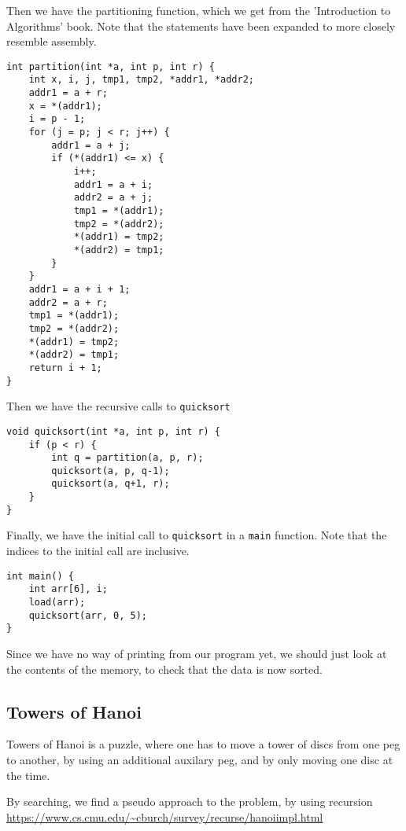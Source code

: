 \documentclass{beamer}
\begin{document}
\begin{frame}
    Then we have the partitioning function, which we get from the 'Introduction
    to Algorithms' book. Note that the statements have been expanded to more
    closely resemble assembly.
\end{frame}
\begin{frame}[fragile]
\begin{lstlisting}
int partition(int *a, int p, int r) {
    int x, i, j, tmp1, tmp2, *addr1, *addr2;
    addr1 = a + r;
    x = *(addr1);
    i = p - 1;
    for (j = p; j < r; j++) {
        addr1 = a + j;
        if (*(addr1) <= x) {
            i++;
            addr1 = a + i;
            addr2 = a + j;
            tmp1 = *(addr1);
            tmp2 = *(addr2);
            *(addr1) = tmp2;
            *(addr2) = tmp1;
        }
    }
    addr1 = a + i + 1;
    addr2 = a + r;
    tmp1 = *(addr1);
    tmp2 = *(addr2);
    *(addr1) = tmp2;
    *(addr2) = tmp1;
    return i + 1;
}
\end{lstlisting}
\end{frame}
\begin{frame}[fragile]
    Then we have the recursive calls to \texttt{quicksort}
\begin{lstlisting}
void quicksort(int *a, int p, int r) {
    if (p < r) {
        int q = partition(a, p, r);
        quicksort(a, p, q-1);
        quicksort(a, q+1, r);
    }
}
\end{lstlisting}
\end{frame}
\begin{frame}[fragile]
    Finally, we have the initial call to \texttt{quicksort} in a \texttt{main}
    function. Note that the indices to the initial call are inclusive.
\begin{lstlisting}
int main() {
    int arr[6], i;
    load(arr);
    quicksort(arr, 0, 5);
}
\end{lstlisting}
\end{frame}
\begin{frame}
    Since we have no way of printing from our program yet, we should just look
    at the contents of the memory, to check that the data is now sorted.
\end{frame}

\subsection{Towers of Hanoi}
\begin{frame}
    Towers of Hanoi is a puzzle, where one has to move a tower of discs from
    one peg to another, by using an additional auxilary peg, and by only moving
    one disc at the time.

    \vspace{\baselineskip}
    By searching, we find a pseudo approach to the problem, by using recursion
    \url{https://www.cs.cmu.edu/~cburch/survey/recurse/hanoiimpl.html}
\end{frame}
\end{document}
